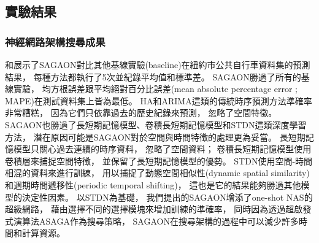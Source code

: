 \documentclass[a4paper,14pt]{extarticle}
\begin{document}
        \subsection{實驗結果}
            
            \subsubsection{神經網路架構搜尋成果}

                和展示了SAGAON對比其他基線實驗(baseline)在紐約市公共自行車資料集的預測結果，
                每種方法都執行了5次並紀錄平均值和標準差。
                SAGAON勝過了所有的基線實驗，
                均方根誤差跟平均絕對百分比誤差(mean absolute percentage error ; MAPE)在測試資料集上皆為最低。
                HA和ARIMA這類的傳統時序預測方法準確率非常糟糕，
                因為它們只依靠過去的歷史紀錄來預測，
                忽略了空間特徵。
                SAGAON也勝過了長短期記憶模型、卷積長短期記憶模型和STDN這類深度學習方法，
                潛在原因可能是SAGAON對於空間與時間特徵的處理更為妥當。
                長短期記憶模型只關心過去連續的時序資料，
                忽略了空間資料；
                卷積長短期記憶模型使用卷積層來捕捉空間特徵，
                並保留了長短期記憶模型的優勢。
                STDN使用空間-時間相混的資料來進行訓練，
                用以捕捉了動態空間相似性(dynamic spatial similarity)和週期時間遞移性(periodic temporal shifting)，
                這也是它的結果能夠勝過其他模型的決定性因素。
                以STDN為基礎，
                我們提出的SAGAON增添了one-shot NAS的超級網路，
                藉由選擇不同的選擇模塊來增加訓練的準確率，
                同時因為透過超啟發式演算法ASAGA作為搜尋策略，
                SAGAON在搜尋架構的過程中可以減少許多時間和計算資源。
\end{document}
